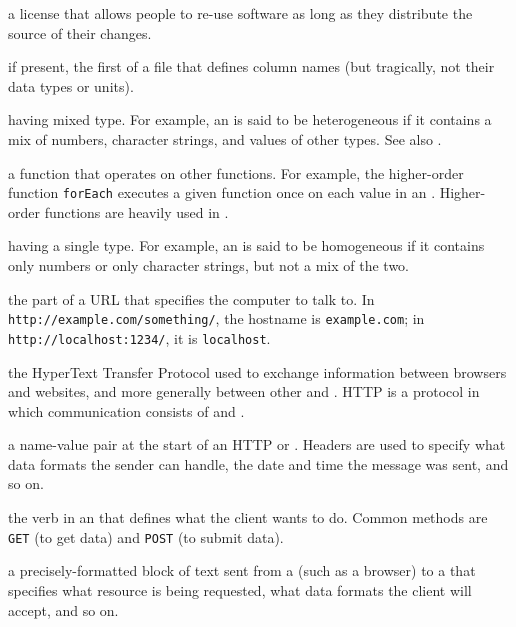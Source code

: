 \begin{description}
a license that allows people to re-use software as long as they distribute
the source of their changes.

if present, the first of a  file that defines column names (but
tragically, not their data types or units).

having mixed type. For example, an  is said to be
heterogeneous if it contains a mix of numbers, character strings, and values
of other types. See also .

a function that operates on other functions. For example, the higher-order
function \texttt{forEach} executes a given function once on each value in an
. Higher-order functions are heavily used in .

having a single type. For example, an  is said to be
homogeneous if it contains only numbers or only character strings, but not a
mix of the two.

the part of a URL that specifies the computer to talk to. In
\texttt{http://example.com/something/}, the hostname is \texttt{example.com}; in
\texttt{http://localhost:1234/}, it is \texttt{localhost}.

the HyperText Transfer Protocol used to exchange information between browsers
and websites, and more generally between other  and
. HTTP is a  protocol in which
communication consists of  and
.

a name-value pair at the start of an HTTP  or
. Headers are used to specify what data formats
the sender can handle, the date and time the message was sent, and so on.

the verb in an  that defines what the client
wants to do. Common methods are \texttt{GET} (to get data) and \texttt{POST} (to submit
data).

a precisely-formatted block of text sent from a  (such as a
browser) to a  that specifies what resource is being
requested, what data formats the client will accept, and so on.


\end{description}
